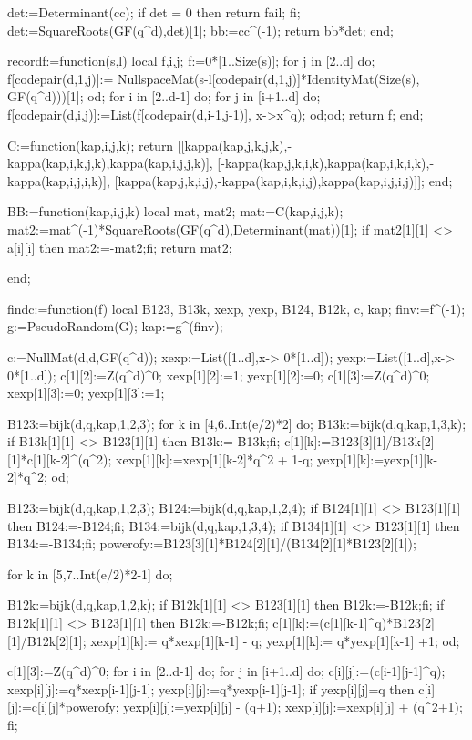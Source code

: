 det:=Determinant(cc);
if det = 0 then 
   return fail;
fi;
det:=SquareRoots(GF(q^d),det)[1];
bb:=cc^(-1);
return bb*det;
end;


recordf:=function(s,l) local f,i,j;
f:=0*[1..Size(s)];
for j in [2..d] do;
f[codepair(d,1,j)]:= NullspaceMat(s-l[codepair(d,1,j)]*IdentityMat(Size(s), GF(q^d)))[1];
od;
for i in [2..d-1] do;
for j in [i+1..d] do;
f[codepair(d,i,j)]:=List(f[codepair(d,i-1,j-1)], x->x^q);
od;od;
return f;
end;

C:=function(kap,i,j,k);
return
[[kappa(kap,j,k,j,k),-kappa(kap,i,k,j,k),kappa(kap,i,j,j,k)],
[-kappa(kap,j,k,i,k),kappa(kap,i,k,i,k),-kappa(kap,i,j,i,k)],
[kappa(kap,j,k,i,j),-kappa(kap,i,k,i,j),kappa(kap,i,j,i,j)]];
end;

BB:=function(kap,i,j,k) local mat, mat2;
mat:=C(kap,i,j,k);
mat2:=mat^(-1)*SquareRoots(GF(q^d),Determinant(mat))[1];
if mat2[1][1] <> a[i][i] then mat2:=-mat2;fi;
return mat2;

end;

findc:=function(f) local B123, B13k, xexp, yexp, B124, B12k, c, kap;
finv:=f^(-1);
g:=PseudoRandom(G);
kap:=g^(finv);

c:=NullMat(d,d,GF(q^d));
xexp:=List([1..d],x-> 0*[1..d]);
yexp:=List([1..d],x-> 0*[1..d]);
c[1][2]:=Z(q^d)^0;
xexp[1][2]:=1;
yexp[1][2]:=0;
c[1][3]:=Z(q^d)^0;
xexp[1][3]:=0;
yexp[1][3]:=1;


B123:=bijk(d,q,kap,1,2,3);
for k in [4,6..Int(e/2)*2] do;
B13k:=bijk(d,q,kap,1,3,k);
if B13k[1][1] <> B123[1][1] then B13k:=-B13k;fi;
c[1][k]:=B123[3][1]/B13k[2][1]*c[1][k-2]^(q^2);
xexp[1][k]:=xexp[1][k-2]*q^2 + 1-q;
yexp[1][k]:=yexp[1][k-2]*q^2;
od;

B123:=bijk(d,q,kap,1,2,3);
B124:=bijk(d,q,kap,1,2,4);
if B124[1][1] <> B123[1][1] then B124:=-B124;fi;
B134:=bijk(d,q,kap,1,3,4);
if B134[1][1] <> B123[1][1] then B134:=-B134;fi;
powerofy:=B123[3][1]*B124[2][1]/(B134[2][1]*B123[2][1]);


for k in [5,7..Int(e/2)*2-1] do;

B12k:=bijk(d,q,kap,1,2,k);
if B12k[1][1] <> B123[1][1] then B12k:=-B12k;fi;
if B12k[1][1] <> B123[1][1] then B12k:=-B12k;fi;
c[1][k]:=(c[1][k-1]^q)*B123[2][1]/B12k[2][1];
xexp[1][k]:= q*xexp[1][k-1] - q;
yexp[1][k]:= q*yexp[1][k-1] +1;
od;

c[1][3]:=Z(q^d)^0;
for i in [2..d-1] do;
for j in [i+1..d] do;
c[i][j]:=(c[i-1][j-1]^q);
xexp[i][j]:=q*xexp[i-1][j-1];
yexp[i][j]:=q*yexp[i-1][j-1];
if yexp[i][j]=q then 
c[i][j]:=c[i][j]*powerofy;
yexp[i][j]:=yexp[i][j] - (q+1);
xexp[i][j]:=xexp[i][j] + (q^2+1);
fi;

